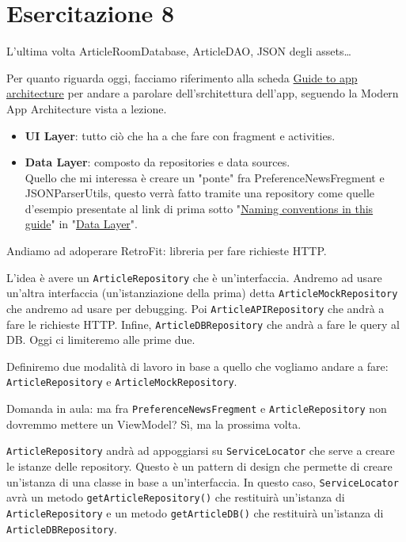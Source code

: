 
\chapter{Esercitazione 8}
\par L'ultima volta ArticleRoomDatabase, ArticleDAO, JSON degli assets\dots
\par Per quanto riguarda oggi, facciamo riferimento alla scheda \href{https://developer.android.com/topic/architecture}{Guide to app architecture} per andare a parolare dell'srchitettura dell'app, seguendo la Modern App Architecture vista a lezione.
\begin{itemize}
    \item \textbf{UI Layer}: tutto ciò che ha a che fare con fragment e activities.
    \item \textbf{Data Layer}: composto da repositories e data sources.\\
    Quello che mi interessa è creare un "ponte" fra PreferenceNewsFregment e JSONParserUtils, questo verrà fatto tramite una repository come quelle d'esempio presentate al link di prima sotto "\href{https://developer.android.com/topic/architecture/data-layer#naming-conventions}{Naming conventions in this guide}" in "\href{https://developer.android.com/topic/architecture/data-layer}{Data Layer}".
\end{itemize}
\par Andiamo ad adoperare RetroFit: libreria per fare richieste HTTP.
\par L'idea è avere un \texttt{ArticleRepository} che è un'interfaccia. Andremo ad usare un'altra interfaccia (un'istanziazione della prima) detta \texttt{ArticleMockRepository} che andremo ad usare per debugging. Poi \texttt{ArticleAPIRepository} che andrà a fare le richieste HTTP. Infine, \texttt{ArticleDBRepository} che andrà a fare le query al DB. Oggi ci limiteremo alle prime due.
\par Definiremo due modalità di lavoro in base a quello che vogliamo andare a fare: \texttt{ArticleRepository} e \texttt{ArticleMockRepository}.
\par Domanda in aula: ma fra \texttt{PreferenceNewsFregment} e \texttt{ArticleRepository} non dovremmo mettere un ViewModel? Sì, ma la prossima volta.
\par \texttt{ArticleRepository} andrà ad appoggiarsi su \texttt{ServiceLocator} che serve a creare le istanze delle repository. Questo è un pattern di design che permette di creare un'istanza di una classe in base a un'interfaccia. In questo caso, \texttt{ServiceLocator} avrà un metodo \texttt{getArticleRepository()} che restituirà un'istanza di \texttt{ArticleRepository} e un metodo \texttt{getArticleDB()} che restituirà un'istanza di \texttt{ArticleDBRepository}.
